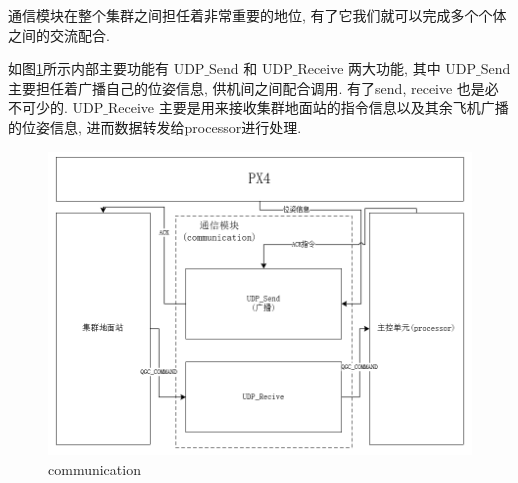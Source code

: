 通信模块在整个集群之间担任着非常重要的地位, 有了它我们就可以完成多个个体之间的交流配合. \par
如图\ref{fig:comm}所示内部主要功能有 UDP$\_$Send 和 UDP$\_$Receive 两大功能, 其中 UDP$\_$Send 主要担任着广播自己的位姿信息, 供机间之间配合调用. 有了send, receive 也是必不可少的. UDP$\_$Receive 主要是用来接收集群地面站的指令信息以及其余飞机广播的位姿信息, 进而数据转发给processor进行处理. 
\begin{figure}[htbp]
    \centering
    \includegraphics[width=\textwidth]{pictures/communication.png}
    \caption{communication}
    \label{fig:comm}
\end{figure}